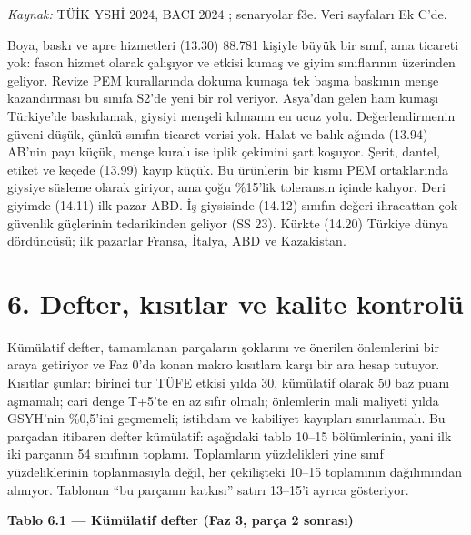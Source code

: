 \endgroup

\emph{Kaynak:} TÜİK YSHİ 2024, BACI 2024 \etiketV{}; senaryolar \etiketT{} f3e. Veri sayfaları Ek C'de.

Boya, baskı ve apre hizmetleri (13.30) 88.781 kişiyle büyük bir sınıf, ama ticareti yok: fason hizmet olarak çalışıyor ve etkisi kumaş ve giyim sınıflarının üzerinden geliyor. Revize PEM kurallarında dokuma kumaşa tek başına baskının menşe kazandırması bu sınıfa S2'de yeni bir rol veriyor. Asya'dan gelen ham kumaşı Türkiye'de baskılamak, giysiyi menşeli kılmanın en ucuz yolu. Değerlendirmenin güveni düşük, çünkü sınıfın ticaret verisi yok. Halat ve balık ağında (13.94) AB'nin payı küçük, menşe kuralı ise iplik çekimini şart koşuyor. Şerit, dantel, etiket ve keçede (13.99) kayıp küçük. Bu ürünlerin bir kısmı PEM ortaklarında giysiye süsleme olarak giriyor, ama çoğu \%15'lik toleransın içinde kalıyor. Deri giyimde (14.11) ilk pazar ABD. İş giysisinde (14.12) sınıfın değeri ihracattan çok güvenlik güçlerinin tedarikinden geliyor (SS 23). Kürkte (14.20) Türkiye dünya dördüncüsü; ilk pazarlar Fransa, İtalya, ABD ve Kazakistan.

\hypertarget{nace_kartlar_13-15-6-defter-kux131sux131tlar-ve-kalite-kontroluxfc}{%
\section{6. Defter, kısıtlar ve kalite kontrolü}\label{nace_kartlar_13-15-6-defter-kux131sux131tlar-ve-kalite-kontroluxfc}}

Kümülatif defter, tamamlanan parçaların şoklarını ve önerilen önlemlerini bir araya getiriyor ve Faz 0'da konan makro kısıtlara karşı bir ara hesap tutuyor. Kısıtlar şunlar: birinci tur TÜFE etkisi yılda 30, kümülatif olarak 50 baz puanı aşmamalı; cari denge T+5'te en az sıfır olmalı; önlemlerin mali maliyeti yılda GSYH'nin \%0,5'ini geçmemeli; istihdam ve kabiliyet kayıpları sınırlanmalı. Bu parçadan itibaren defter kümülatif: aşağıdaki tablo 10--15 bölümlerinin, yani ilk iki parçanın 54 sınıfının toplamı. Toplamların yüzdelikleri yine sınıf yüzdeliklerinin toplanmasıyla değil, her çekilişteki 10--15 toplamının dağılımından alınıyor. Tablonun ``bu parçanın katkısı'' satırı 13--15'i ayrıca gösteriyor.


\textbf{Tablo 6.1 --- Kümülatif defter (Faz 3, parça 2 sonrası)}

\nopagebreak[4]

\begingroup\gbtablo\small

